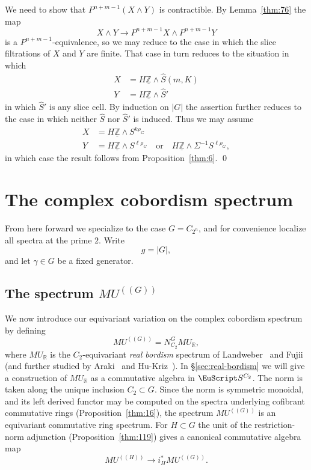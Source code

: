 \documentclass{amsart}
\theoremstyle{definition}
\theoremstyle{remark}
\newenvironment{pf}{\bigskip{\em Proof:\/}}{\qed\medskip}
\newcommand{\Z}{{\mathbb Z}}
\newcommand{\R}{{\mathbb R}}
\newcommand{\spectra}{\EuScript S}
\newcommand{\mur}{MU_{\R}}
\newcommand{\mutn}[1]{MU^{(\!(#1)\!)}}
\newcommand{\ssmutn}[1]{MU#1}
\newcommand{\norm}{N}
\newcommand{\Zm}{\underline{\Z}}
\newcommand{\ugspectra}[1]{\spectra^{#1}}
\newcommand{\zt}{C_{2}}
\newcommand{\ztn}{C_{2^{n}}}
\newcommand{\slicecell}{\widehat{S}}
\begin{document}
\begin{pf}
We need to show that $P^{n+m-1}(X\wedge Y)$ is contractible.   By
Lemma~\ref{thm:76} the map
\[
X\wedge Y \to P^{n+m-1}X\wedge P^{n+m-1}Y
\]
is a $P^{n+m-1}$-equivalence, so we may reduce to the case in which
the slice filtrations of $X$ and $Y$ are finite.  That case in turn
reduces to the situation in which
\begin{align*}
X &= H\Zm\wedge \slicecell(m,K)\\
Y &= H\Zm\wedge \slicecell'
\end{align*}
in which $\slicecell'$ is any slice cell.  By induction on $|G|$ the
assertion further reduces to the case in which neither $\slicecell$
nor $\slicecell'$ is induced.  Thus we may assume
\begin{align*}
X &= H\Zm\wedge S^{k\rho_{G}} \\
Y &= H\Zm\wedge S^{\ell\rho_{G}}\quad \text{or}\quad H\Zm\wedge
\Sigma^{-1}S^{\ell\rho_{G}},
\end{align*}
in which case the result follows from Proposition~\ref{thm:6}.
\end{pf}

\section{The complex cobordism spectrum}
\label{sec:case-mu}

From here forward we specialize to the case $G=\ztn$, and for
convenience localize all spectra at the prime $2$.  Write
\[
g=|G|,
\]
and let $\gamma\in G$ be a fixed generator.   

\subsection{\texorpdfstring{The spectrum $\mutn{G}$}{The spectrum $\ssmutn{G}$}}
\label{sec:spectrum-mutng}

We now introduce our equivariant variation on the complex cobordism
spectrum by defining
\[
\mutn{G} = \norm_{\zt}^{G}\mur,
\]
where $\mur$ is the $\zt$-equivariant {\em real bordism} spectrum of
Landweber~\cite{MR0222890} and Fujii~\cite{MR0420597} (and further
studied by Araki~\cite{MR614829} and Hu-Kriz~\cite{MR1808224}).  In
\S\ref{sec:real-bordism} we will give a construction of $\mur$ as a
commutative algebra in $\ugspectra{\zt}$.  The norm is taken along the
unique inclusion $\zt\subset G$.  Since the norm is symmetric
monoidal, and its left derived functor may be computed on the spectra
underlying cofibrant commutative rings (Proposition~\ref{thm:16}), the
spectrum $\mutn{G}$ is an equivariant commutative ring spectrum.  For
$H\subset G$ the unit of the restriction-norm adjunction
(Proposition~\ref{thm:119}) gives a canonical commutative algebra map
\begin{equation}\label{eq:72}
\mutn{H} \to i_{H}^{\ast}\mutn{G}.
\end{equation}
\end{document}
